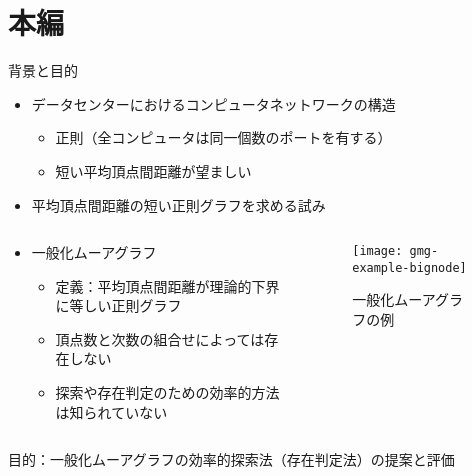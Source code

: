 \begin{frame}
  \maketitle
\end{frame}

\section{本編}
\begin{frame}{背景と目的}
  \begin{itemize}
  \item データセンターにおけるコンピュータネットワークの構造
    \begin{itemize}
    \item 正則（全コンピュータは同一個数のポートを有する）
    \item 短い平均頂点間距離が望ましい\cite{Koibuchi2012,Singla2011}
    \end{itemize}    
  \item 平均頂点間距離の短い正則グラフを求める試み\cite{Fujita2015,Yamamoto2016}
  \end{itemize}
  \begin{columns}[T]
    \begin{column}{.53\textwidth}
      \begin{itemize}
      \item \alert{一般化ムーアグラフ}
        \begin{itemize}
        \item 定義：平均頂点間距離が理論的下界に等しい正則グラフ
          \cite{cerf1973computer, Cerf1974}
        \item 頂点数と次数の組合せによっては存在しない
        \item 探索や存在判定のための効率的方法は知られていない
        \end{itemize}
      \end{itemize}
    \end{column}
    \hspace{\fill}
    \begin{column}{.42\textwidth}
      \begin{figure}
        \texttt{[image: gmg-example-bignode]}
        \caption{一般化ムーアグラフの例}
      \end{figure}
    \end{column}
  \end{columns}
  \begin{block}{}
    目的：一般化ムーアグラフの効率的探索法（存在判定法）の提案と評価
  \end{block}
\end{frame}

